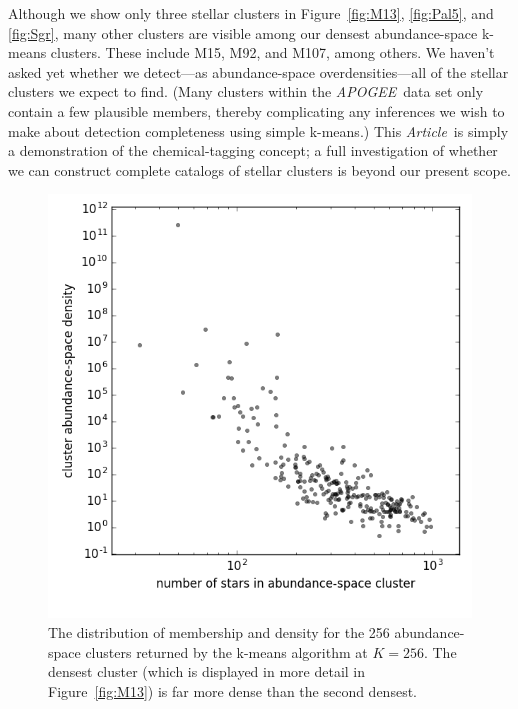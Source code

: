 \documentclass[manuscript, letterpaper]{aastex6}
\newcommand{\acronym}[1]{{\small{#1}}}
\newcommand{\project}[1]{\textsl{#1}}
\newcommand{\apogee}{\project{\acronym{APOGEE}}}
\newcommand{\documentname}{\textsl{Article}}
\renewcommand{\figurename}{Figure} %
\newlength{\figwidth}\setlength{\figwidth}{0.3\textwidth}
\begin{document}
Although we show only three stellar clusters in
\figurename~\ref{fig:M13}, \ref{fig:Pal5}, and \ref{fig:Sgr}, many
other clusters are visible among our densest abundance-space k-means
clusters.
These include M15, M92, and M107, among others.
We haven't asked yet whether we detect---as abundance-space
overdensities---all of the stellar clusters we expect to find. (Many
clusters within the \apogee\ data set only contain a few plausible 
members, thereby  complicating any inferences we wish to make about 
detection completeness using simple k-means.) 
This \documentname\ is simply a demonstration of the chemical-tagging
concept; a full investigation of whether we can construct complete
catalogs of stellar clusters is beyond our present scope.

\begin{figure}[!bp]
\includegraphics[width=1.5\figwidth]{./figs/clusters_0256.png}
\caption{The distribution of membership and density for the 256
  abundance-space clusters returned by the k-means algorithm at
  $K=256$.  The densest cluster (which is displayed in more detail in 
  \figurename~\ref{fig:M13}) is far more dense than the second
  densest.\label{fig:densities}}
\end{figure}
\end{document}
